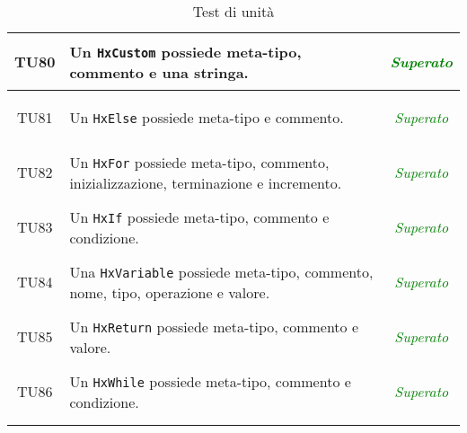 \begin{longtable}{|c|>{}m{8cm}|c|}
\hypertarget{TU80}{TU80} & Un \texttt{HxCustom} possiede meta-tipo, commento e una stringa. & \textcolor{Green}{\textit{Superato}}\\ \hline
\hypertarget{TU81}{TU81} & Un \texttt{HxElse} possiede meta-tipo e commento. & \textcolor{Green}{\textit{Superato}}\\ \hline
\hypertarget{TU82}{TU82} & Un \texttt{HxFor} possiede meta-tipo, commento, inizializzazione, terminazione e incremento. & \textcolor{Green}{\textit{Superato}}\\ \hline
\hypertarget{TU83}{TU83} & Un \texttt{HxIf} possiede meta-tipo, commento e condizione. & \textcolor{Green}{\textit{Superato}}\\ \hline
\hypertarget{TU84}{TU84} & Una \texttt{HxVariable} possiede meta-tipo, commento, nome, tipo, operazione e valore. & \textcolor{Green}{\textit{Superato}}\\ \hline
\hypertarget{TU85}{TU85} & Un \texttt{HxReturn} possiede meta-tipo, commento e valore. & \textcolor{Green}{\textit{Superato}}\\ \hline
\hypertarget{TU86}{TU86} & Un \texttt{HxWhile} possiede meta-tipo, commento e condizione. & \textcolor{Green}{\textit{Superato}}\\ \hline
\caption[Test di unità]{Test di unità}
\label{tab:unit}
\end{longtable}
\clearpage



